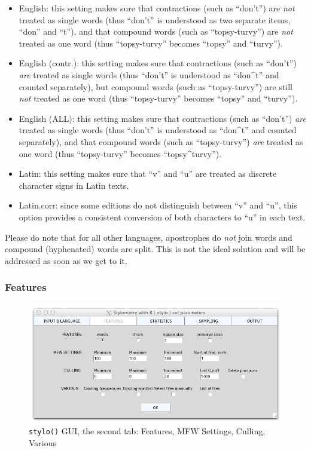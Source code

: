 \documentclass[11pt,a4paper]{article}
\def\margin#1{\marginpar{\textcolor{blue}{\footnotesize\tt #1}}}
\def\code#1{{\tt #1}}
\begin{document}
\begin{itemize}

\item English: this setting makes sure that contractions (such as “don’t”)
are \emph{not} treated as single words (thus ``don't'' is understood
as two separate items, “don” and “t”), and that compound words (such
as “topsy-turvy”) are \emph{not} treated as one word (thus “topsy-turvy”
becomes “topsy” and “turvy”).\margin{"English"} 

\item English (contr.): this setting makes sure that contractions (such as “don’t”) \emph{are} treated as single words (thus ``don't'' is understood as “don\^{ }t” and counted separately), but compound words (such as “topsy-turvy”) are still \emph{not} treated as one word (thus “topsy-turvy” becomes “topsy” and “turvy”).\margin{"English.contr"} 

\item English (ALL): this setting makes sure that contractions (such as
“don’t”) \emph{are} treated as single words (thus ``don't'' is understood
as “don\^{ }t” and counted separately), and that compound words (such
as “topsy-turvy”) \emph{are} treated as one word (thus “topsy-turvy”
becomes “topsy\^{ }turvy”).\margin{"English.all"} 

\item Latin: this setting makes sure that “v” and “u” are treated as discrete
character signs in Latin texts.\margin{"Latin"} 

\item Latin.corr: since some editions do not distinguish between “v” and
“u”, this option provides a consistent conversion of both characters
to “u” in each text.\margin{"Latin.corr"} 
\end{itemize}

Please do note that for all other languages, apostrophes do \emph{not}
join words and compound (hyphenated) words are split. This is not
the ideal solution and will be addressed as soon as we get to it.


\subsubsection{Features}

\begin{figure}
  \centering
  \includegraphics[width=0.8\linewidth]{img/stylo-gui_tab2.png}
  \caption{\code{stylo()} GUI, the second tab: Features, MFW Settings, Culling, Various}
\end{figure}
\end{document}
